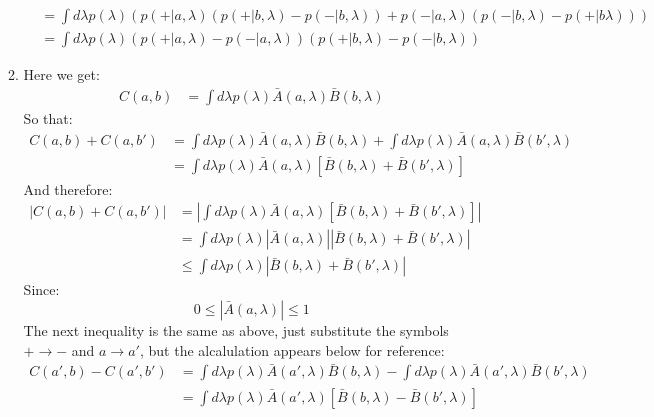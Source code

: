 \documentclass[12pt,a4]{article}
\begin{document}
\begin{enumerate}
\begin{enumerate}
\begin{align*}
                 &= \int d\lambda p(\lambda) \left(p(+| a, \lambda)(p(+|b, \lambda) - p(- | b, \lambda)) + p(-| a,\lambda)(p(-| b,\lambda) - p(+ | b \lambda))\right)\\
                 &= \int d\lambda p(\lambda) (p(+| a, \lambda) - p(-| a,\lambda))(p(+|b, \lambda) - p(- | b, \lambda))  
        \end{align*}
      \item
        Here we get:
        \begin{align*}
          C(a,b) &= \int d\lambda p(\lambda) \bar{A}(a, \lambda)\bar{B}(b, \lambda) 
        \end{align*}
        So that:
        \begin{align*}
          C(a,b) + C(a,b') &= \int d\lambda p(\lambda) \bar{A}(a, \lambda)\bar{B}(b, \lambda) + \int d\lambda p(\lambda) \bar{A}(a, \lambda)\bar{B}(b', \lambda)\\
                           &= \int d\lambda p(\lambda) \bar{A}(a, \lambda)\left[\bar{B}(b, \lambda) + \bar{B}(b', \lambda)\right]
        \end{align*}
        And therefore:
        \begin{align*}
          |C(a,b) + C(a,b')| 
                             &= \left|\int d\lambda p(\lambda) \bar{A}(a, \lambda)\left[\bar{B}(b, \lambda) + \bar{B}(b', \lambda)\right]\right|\\
                             &= \int d\lambda p(\lambda) \left|\bar{A}(a, \lambda)\right| \left|\bar{B}(b, \lambda) + \bar{B}(b', \lambda)\right|\\
                             &\leq \int d\lambda p(\lambda) \left|\bar{B}(b, \lambda) + \bar{B}(b', \lambda)\right|
        \end{align*}
        Since:
        \begin{equation*}
          0 \le \left|\bar{A}(a, \lambda)\right| \le 1
        \end{equation*}
        The next inequality is the same as above, just substitute the symbols $+ \to -$ and $a \to a'$, but the alcalulation appears below for reference:
        \begin{align*}
          C(a',b) - C(a',b') &= \int d\lambda p(\lambda) \bar{A}(a', \lambda)\bar{B}(b, \lambda) - \int d\lambda p(\lambda) \bar{A}(a', \lambda)\bar{B}(b', \lambda)\\
                             &= \int d\lambda p(\lambda) \bar{A}(a', \lambda)\left[\bar{B}(b, \lambda) - \bar{B}(b', \lambda)\right]
        \end{align*}

\end{enumerate}
\end{enumerate}
\end{document}
